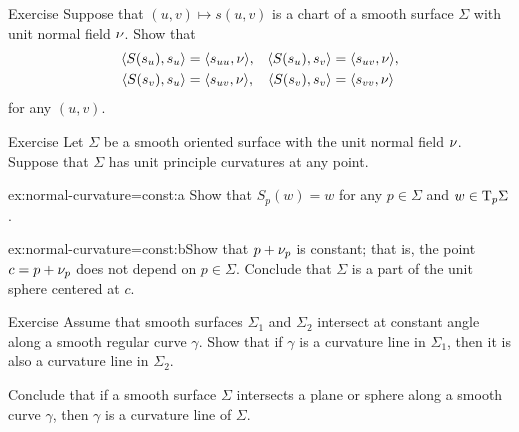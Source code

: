\begin{thm}{Exercise}\label{ex:shape-chart}
Suppose that $(u,v)\mapsto s(u,v)$ is a chart of a smooth surface $\Sigma$ with unit normal field $\nu$.
Show that 
\begin{align*}
\langle S(s_u), s_u\rangle 
&=\langle s_{uu},\nu\rangle,
&
\langle S(s_u), s_v\rangle 
&=\langle s_{uv},\nu\rangle,
\\
\langle S(s_v), s_u\rangle 
&=\langle s_{uv},\nu\rangle,
&
\langle S(s_v), s_v\rangle 
&=\langle s_{vv},\nu\rangle
\end{align*}
for any $(u,v)$.

\end{thm}

\begin{thm}{Exercise}\label{ex:normal-curvature=const}
Let $\Sigma$ be a smooth oriented surface with the unit normal field $\nu$.
Suppose that $\Sigma$ has unit principle curvatures at any point.

\begin{subthm}{ex:normal-curvature=const:a} Show that $S_p(w)=w$ for any $p\in\Sigma$ and $w\in \mathrm{T}_p\Sigma$.
\end{subthm}

\begin{subthm}{ex:normal-curvature=const:b}Show that $p+\nu_p$ is constant; that is, the point $c=p+\nu_p$ does not depend on $p\in\Sigma$.
Conclude that $\Sigma$ is a part of the unit sphere centered at $c$.
\end{subthm}

\end{thm}

\begin{thm}{Exercise}\label{ex:shape-curvature-line}
Assume that smooth surfaces $\Sigma_1$ and $\Sigma_2$ intersect at constant angle along a smooth regular curve $\gamma$.
Show that if $\gamma$ is a curvature line in $\Sigma_1$, then it is also a curvature line in $\Sigma_2$.

Conclude that if a smooth surface $\Sigma$ intersects a plane or sphere along a smooth curve $\gamma$,
then $\gamma$ is a curvature line of $\Sigma$.
\end{thm}
